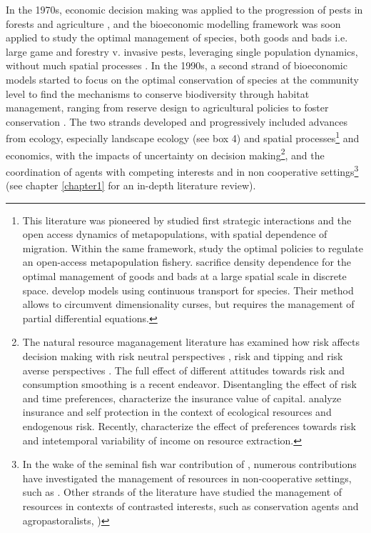 In the 1970s, economic decision making was applied to the progression of pests in forests and agriculture \citep{Hueth1974, Feder1975}, and the bioeconomic modelling framework was soon applied to study the optimal management of species, both goods and bads i.e. large game and forestry v. invasive pests, leveraging single population dynamics, without much spatial processes \citep{swanson_economics_1994, Skonhoft1999_on,ALEXANDER2000, Horan2002}.  In the 1990s, a second strand of bioeconomic models started to focus on the optimal conservation of species at the community level to find the mechanisms to conserve biodiversity through habitat management, ranging from reserve design to agricultural policies to foster conservation \citep{costello_dynamic_2004, Polasky2001,Polasky2005, Watzold2016a, Mouysset2011}. The two strands developed and progressively included advances from ecology, especially landscape ecology (see box 4) and spatial processes\footnote{This literature was pioneered by \cite{huffaker_optimal_1992, brown_metapopulation_1997, sanchirico_bioeconomics_1999} studied first strategic interactions and the open access dynamics of metapopulations, with spatial dependence of migration. Within the same framework,  \cite{SANCHIRICO200523} study the optimal policies to regulate an open-access metapopulation fishery. \cite{costello_optimal_2008, blackwood_cost-effective_2010}  sacrifice density dependence for the optimal management of goods and bads at a large spatial scale in discrete space. \cite{brock_pattern_2010, brock_2020} develop models using continuous transport for species. Their method allows to circumvent dimensionality curses, but requires the management of partial differential equations.} and economics, with the impacts of uncertainty on decision making\footnote{The natural resource maganagement literature has examined how risk affects decision making with risk neutral perspectives \citep{reed_1979_optimal, costello_optimal_2008}, risk and tipping \citep{costello_renewable_2019} and risk averse perspectives \citep{McGoughPlantingaCostello+2009,kapaun_does_2013,
TAHVONEN2018659}.
The full effect of different attitudes towards risk and consumption smoothing is a recent endeavor. Disentangling the effect of risk and time preferences, \cite{quaas_2019_insurance, AugeraudVeron2019} characterize the insurance value of capital. \cite{berry_2019} analyze insurance and self protection in the context of ecological resources and endogenous risk. Recently, \cite{KELSALL2023102855} characterize the effect of preferences towards risk and intetemporal variability of income on resource extraction.}, and the coordination of agents with competing interests and in non cooperative settings\footnote{In the wake of the seminal fish war contribution of \cite{levhari_great_1980}, numerous contributions have investigated the management of resources in non-cooperative settings, such as \cite{janmaat_sharing_2005, kaffine_unitization_2010, costello_partial_2015, costello_private_2017}. Other strands of the literature have studied the management of resources in contexts of contrasted interests, such as conservation agents and agropastoralists, \cite{Skonhoft1998})} (see chapter \ref{chapter1} for an in-depth literature review).

